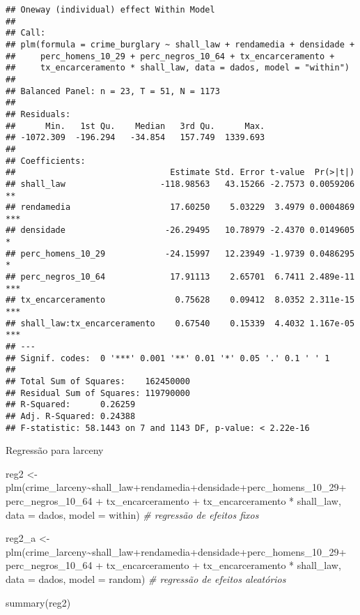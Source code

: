 \documentclass[
]{article}
\newenvironment{Shaded}{\begin{snugshade}}{\end{snugshade}}
\newcommand{\AttributeTok}[1]{\textcolor[rgb]{0.77,0.63,0.00}{#1}}
\newcommand{\CommentTok}[1]{\textcolor[rgb]{0.56,0.35,0.01}{\textit{#1}}}
\newcommand{\FunctionTok}[1]{\textcolor[rgb]{0.00,0.00,0.00}{#1}}
\newcommand{\NormalTok}[1]{#1}
\newcommand{\OtherTok}[1]{\textcolor[rgb]{0.56,0.35,0.01}{#1}}
\newcommand{\SpecialCharTok}[1]{\textcolor[rgb]{0.00,0.00,0.00}{#1}}
\newcommand{\StringTok}[1]{\textcolor[rgb]{0.31,0.60,0.02}{#1}}
\begin{document}
\begin{verbatim}
## Oneway (individual) effect Within Model
## 
## Call:
## plm(formula = crime_burglary ~ shall_law + rendamedia + densidade + 
##     perc_homens_10_29 + perc_negros_10_64 + tx_encarceramento + 
##     tx_encarceramento * shall_law, data = dados, model = "within")
## 
## Balanced Panel: n = 23, T = 51, N = 1173
## 
## Residuals:
##      Min.   1st Qu.    Median   3rd Qu.      Max. 
## -1072.309  -196.294   -34.854   157.749  1339.693 
## 
## Coefficients:
##                               Estimate Std. Error t-value  Pr(>|t|)    
## shall_law                   -118.98563   43.15266 -2.7573 0.0059206 ** 
## rendamedia                    17.60250    5.03229  3.4979 0.0004869 ***
## densidade                    -26.29495   10.78979 -2.4370 0.0149605 *  
## perc_homens_10_29            -24.15997   12.23949 -1.9739 0.0486295 *  
## perc_negros_10_64             17.91113    2.65701  6.7411 2.489e-11 ***
## tx_encarceramento              0.75628    0.09412  8.0352 2.311e-15 ***
## shall_law:tx_encarceramento    0.67540    0.15339  4.4032 1.167e-05 ***
## ---
## Signif. codes:  0 '***' 0.001 '**' 0.01 '*' 0.05 '.' 0.1 ' ' 1
## 
## Total Sum of Squares:    162450000
## Residual Sum of Squares: 119790000
## R-Squared:      0.26259
## Adj. R-Squared: 0.24388
## F-statistic: 58.1443 on 7 and 1143 DF, p-value: < 2.22e-16
\end{verbatim}

Regressão para larceny

\begin{Shaded}
\begin{Highlighting}[]
\NormalTok{reg2 }\OtherTok{\textless{}{-}} \FunctionTok{plm}\NormalTok{(crime\_larceny}\SpecialCharTok{\textasciitilde{}}\NormalTok{shall\_law}\SpecialCharTok{+}\NormalTok{rendamedia}\SpecialCharTok{+}\NormalTok{densidade}\SpecialCharTok{+}\NormalTok{perc\_homens\_10\_29}\SpecialCharTok{+}
\NormalTok{              perc\_negros\_10\_64 }\SpecialCharTok{+}\NormalTok{ tx\_encarceramento }\SpecialCharTok{+}\NormalTok{ tx\_encarceramento }\SpecialCharTok{*}\NormalTok{ shall\_law, }
            \AttributeTok{data =}\NormalTok{ dados, }\AttributeTok{model =} \StringTok{\textquotesingle{}within\textquotesingle{}}\NormalTok{) }\CommentTok{\# regressão de efeitos fixos}

\NormalTok{reg2\_a }\OtherTok{\textless{}{-}} \FunctionTok{plm}\NormalTok{(crime\_larceny}\SpecialCharTok{\textasciitilde{}}\NormalTok{shall\_law}\SpecialCharTok{+}\NormalTok{rendamedia}\SpecialCharTok{+}\NormalTok{densidade}\SpecialCharTok{+}\NormalTok{perc\_homens\_10\_29}\SpecialCharTok{+}
\NormalTok{              perc\_negros\_10\_64 }\SpecialCharTok{+}\NormalTok{ tx\_encarceramento }\SpecialCharTok{+}\NormalTok{ tx\_encarceramento }\SpecialCharTok{*}\NormalTok{ shall\_law, }
            \AttributeTok{data =}\NormalTok{ dados, }\AttributeTok{model =} \StringTok{\textquotesingle{}random\textquotesingle{}}\NormalTok{) }\CommentTok{\# regressão de efeitos aleatórios}

\FunctionTok{summary}\NormalTok{(reg2)}
\end{Highlighting}
\end{Shaded}
\end{document}
